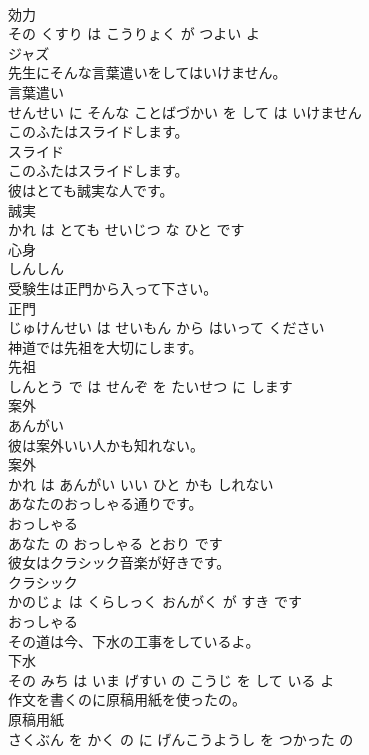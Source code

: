 \documentclass[8pt]{extreport}
\begin{document}
\begin{CJK}{UTF8}{min}
\\	効力 
\\	その くすり は こうりょく が つよい よ			
\\	ジャズ	
\\	先生にそんな言葉遣いをしてはいけません。	
\\	言葉遣い 
\\	せんせい に そんな ことばづかい を して は いけません			
\\	このふたはスライドします。	
\\	スライド 
\\	このふたはスライドします。			
\\	彼はとても誠実な人です。	
\\	誠実 
\\	かれ は とても せいじつ な ひと です			
\\	心身	
\\	しんしん			
\\	受験生は正門から入って下さい。	
\\	正門 
\\	じゅけんせい は せいもん から はいって ください			
\\	神道では先祖を大切にします。	
\\	先祖 
\\	しんとう で は せんぞ を たいせつ に します			
\\	案外	
\\	あんがい			
\\	彼は案外いい人かも知れない。	
\\	案外 
\\	かれ は あんがい いい ひと かも しれない			
\\	あなたのおっしゃる通りです。	
\\	おっしゃる 
\\	あなた の おっしゃる とおり です			
\\	彼女はクラシック音楽が好きです。	
\\	クラシック 
\\	かのじょ は くらしっく おんがく が すき です			
\\	おっしゃる	
\\	その道は今、下水の工事をしているよ。	
\\	下水 
\\	その みち は いま げすい の こうじ を して いる よ			
\\	作文を書くのに原稿用紙を使ったの。	
\\	原稿用紙 
\\	さくぶん を かく の に げんこうようし を つかった の			

\end{CJK}
\end{document}
